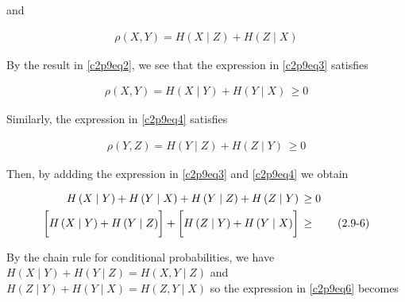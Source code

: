 \documentclass[ClusteringConnectionsMAIN.tex]{subfiles}
\begin{document}
and

\begin{align} \label{c2p9eq5}
\rho \left( X, Y \right) = H \left( X \mid Z \right)+ H \left( Z \mid X \right)  \tag{2.9-5}
\end{align}

By the result in \ref{c2p9eq2}, we see that the expression in \ref{c2p9eq3} satisfies

\begin{align*}
\rho \left( X, Y \right) = H \left( X \mid Y \right)+ H \left( Y \mid X \right)  \, \geq 0
\end{align*}

Similarly, the expression in \ref{c2p9eq4} satisfies

\begin{align*}
\rho \left( Y, Z \right) = H \left( Y \mid Z \right)+ H \left( Z \mid Y \right)  \, \geq 0
\end{align*}

Then, by addding the expression in \ref{c2p9eq3} and \ref{c2p9eq4} we obtain

\begin{align} \label{c2p9eq6}
H \left( X \mid Y \right)+ H \left( Y \mid X \right) + H \left( Y \mid Z \right)+ H \left( Z \mid Y \right)  \, &\geq 0  \notag \\
\biggl[ H \left( X \mid Y \right) + H \left( Y \mid Z \right) \biggr] + \biggl[ H \left( Z \mid Y \right) + H \left( Y \mid X \right) \biggr] \, &\geq  \tag{2.9-6}
\end{align}

By the chain rule for conditional probabilities, we have $H \left( X \mid Y \right) + H \left( Y \mid Z \right) = H \left( X, Y \mid Z \right)$ and $H \left( Z \mid Y \right) + H \left( Y \mid X \right) = H \left( Z, Y \mid X \right)$ so the expression in \ref{c2p9eq6} becomes
\end{document}
